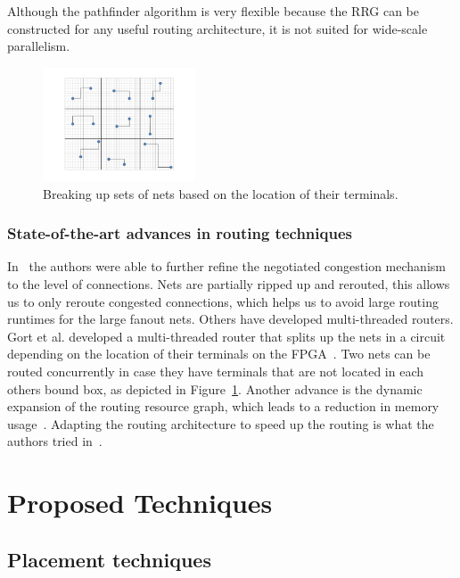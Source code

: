 \documentclass[a4paper,oneside,12pt]{article}
\begin{document}
Although the {\sc pathfinder} algorithm is very flexible because the RRG can be constructed for any useful routing architecture, it is not suited for wide-scale parallelism.

\begin{figure}[ht]
\centering
\includegraphics[width = 0.4\textwidth,trim = 0mm 0mm 0mm 0mm, clip]{parallellisatie}
\caption{Breaking up sets of nets based on the location of their terminals.}
\label{geopara}
\end{figure}

\subsubsection{State-of-the-art advances in routing techniques}
In~\cite{vansteenkiste2013connection} the authors were able to further refine the negotiated congestion mechanism to the level of connections. Nets are partially ripped up and rerouted, this allows us to only reroute congested connections, which helps us to avoid large routing runtimes for the large fanout nets. Others have developed multi-threaded routers. Gort et al. developed a multi-threaded router that splits up the nets in a circuit depending on the location of their terminals on the FPGA~\cite{gort2010deterministic}. Two nets can be routed concurrently in case they have terminals that are not located in each others bound box, as depicted in Figure~\ref{geopara}.
Another advance is the dynamic expansion of the routing resource graph, which leads to a reduction in memory usage~\cite{moctar2015fast}. 	
Adapting the routing architecture to speed up the routing is what the authors tried in~\cite{gort2013combined}.


\section{Proposed Techniques}


\subsection{Placement techniques}\label{placetech}
\end{document}
